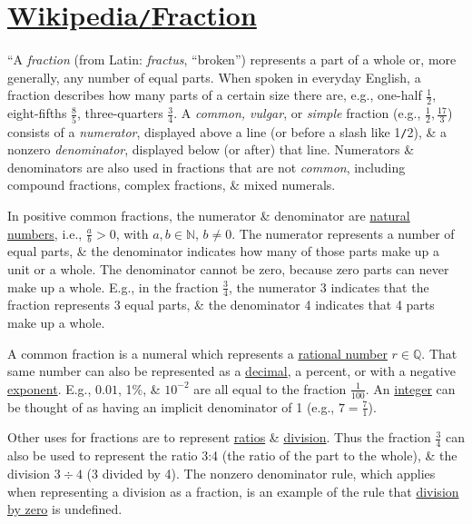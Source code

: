 \documentclass{article}
\begin{document}
\section{\href{https://en.wikipedia.org/wiki/Fraction}{Wikipedia\texttt{/}Fraction}}
``A \textit{fraction} (from Latin: \textit{fractus}, ``broken'') represents a part of a whole or, more generally, any number of equal parts. When spoken in everyday English, a fraction describes how many parts of a certain size there are, e.g., one-half $\frac{1}{2}$, eight-fifths $\frac{8}{5}$, three-quarters $\frac{3}{4}$. A \textit{common, vulgar}, or \textit{simple} fraction (e.g., $\frac{1}{2},\frac{17}{3}$) consists of a \textit{numerator}, displayed above a line (or before a slash like 1\texttt{/}2), \& a nonzero \textit{denominator}, displayed below (or after) that line. Numerators \& denominators are also used in fractions that are not \textit{common}, including compound fractions, complex fractions, \& mixed numerals.

In positive common fractions, the numerator \& denominator are \href{https://en.wikipedia.org/wiki/Natural_number}{natural numbers}, i.e., $\frac{a}{b} > 0$, with $a,b\in\mathbb{N}$, $b\ne0$. The numerator represents a number of equal parts, \& the denominator indicates how many of those parts make up a unit or a whole. The denominator cannot be zero, because zero parts can never make up a whole. E.g., in the fraction $\frac{3}{4}$, the numerator 3 indicates that the fraction represents 3 equal parts, \& the denominator 4 indicates that 4 parts make up a whole.

A common fraction is a numeral which represents a \href{https://en.wikipedia.org/wiki/Rational_number}{rational number} $r\in\mathbb{Q}$. That same number can also be represented as a \href{https://en.wikipedia.org/wiki/Decimal}{decimal}, a percent, or with a negative \href{https://en.wikipedia.org/wiki/Exponentiation}{exponent}. E.g., $0.01$, 1\%, \& $10^{-2}$ are all equal to the fraction $\frac{1}{100}$. An \href{https://en.wikipedia.org/wiki/Integer}{integer} can be thought of as having an implicit denominator of 1 (e.g., $7 = \frac{7}{1}$).

Other uses for fractions are to represent \href{https://en.wikipedia.org/wiki/Ratio}{ratios} \& \href{https://en.wikipedia.org/wiki/Division_(mathematics)}{division}. Thus the fraction $\frac{3}{4}$ can also be used to represent the ratio 3:4 (the ratio of the part to the whole), \& the division $3\div4$ (3 divided by 4). The nonzero denominator rule, which applies when representing a division as a fraction, is an example of the rule that \href{https://en.wikipedia.org/wiki/Division_by_zero}{division by zero} is undefined.
\end{document}
